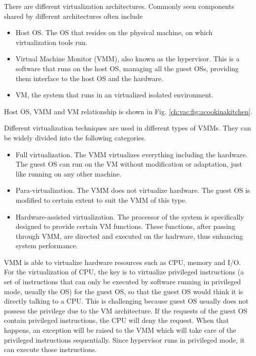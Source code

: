 There are different virtualization architectures. Commonly seen components shared by different architectures often include
\begin{itemize}
	\item Host OS. The OS that resides on the physical machine, on which virtualization tools run.
	\item Virtual Machine Monitor (VMM), also known as the hypervisor. This is a software that runs on the host OS, managing all the guest OSs, providing them interface to the host OS and the hardware.
	\item VM, the system that runs in an virtualized isolated environment.
\end{itemize}
Host OS, VMM and VM relationship is shown in Fig. \ref{ch:vac:fig:acookinakitchen}.

Different virtualization techniques are used in different types of VMMs. They can be widely divided into the following categories.
\begin{itemize}
	\item Full virtualization. The VMM virtualizes everything including the hardware. The guest OS can run on the VM without modification or adaptation, just like running on any other machine.
	\item Para-virtualization. The VMM does not virtualize hardware. The guest OS is modified to certain extent to suit the VMM of this type.
	\item Hardware-assisted virtualization. The processor of the system is specifically designed to provide certain VM functions. These functions, after passing through VMM, are directed and executed on the hadrware, thus enhancing system performance.
\end{itemize}

VMM is able to virtualize hardware resources such as CPU, memory and I/O. For the virtualization of CPU, the key is to virtualize privileged instructions (a set of instructions that can only be executed by software running in privileged mode, usually the OS) for the guest OS, so that the guest OS would think it is directly talking to a CPU. This is challenging because guest OS usually does not possess the privilege due to the VM architecture. If the requests of the guest OS contain privileged instructions, the CPU will deny the request. When that happens, an exception will be raised to the VMM which will take care of the privileged instructions sequentially. Since hypervisor runs in privileged mode, it can execute those instructions.

